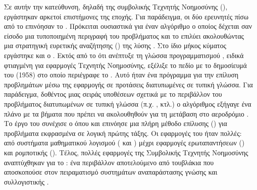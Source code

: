 Σε αυτήν την κατεύθυνση, δηλαδή της συμβολικής Τεχνητής Νοημοσύνης (), εργάστηκαν αρκετοί επιστήμονες της εποχής. Για παράδειγμα, οι δύο ερευνητές πίσω από το  επινόησαν το . Πρόκειται ουσιαστικά για έναν αλγόριθμο ο οποίος δέχεται σαν είσοδο μια τυποποιημένη περιγραφή του προβλήματος και το επιλύει ακολουθώντας μια στρατηγική ευρετικής αναζήτησης () της λύσης \cite{russell2020artificial}. Στο ίδιο μήκος κύματος εργάστηκε και ο . Εκτός από το ότι ανέπτυξε τη γλώσσα προγραμματισμού , ειδικά φτιαγμένη για εφαρμογές Τεχνητής Νοημοσύνης, εξέλιξε το πεδίο με το δημοσίευμά του  (1958) στο οποίο περιέγραφε το . Αυτό ήταν ένα πρόγραμμα για την επίλυση προβλημάτων μέσω της εφαρμογής  σε προτάσεις διατυπωμένες σε τυπική γλώσσα. Για παράδειγμα, δοθέντος μιας σειράς υποθέσεων σχετικά με το περιβάλλον του προβλήματος διατυπωμένων σε τυπική γλώσσα (π.χ. ,  κτλ.) ο αλγόριθμος εξήγαγε ένα πλάνο με τα βήματα που πρέπει να ακολουθηθούν για τη μετάβαση στο αεροδρόμιο \cite{McCarthy1960ProgramsWC}. Το έργο του συνέχισε ο  όπου και επινόησε μια πλήρη μέθοδο επίλυσης () για προβλήματα εκφρασμένα σε λογική πρώτης τάξης. Οι εφαρμογές του ήταν πολλές: από συστήματα μαθηματικού λογισμού ( \cite{Slagle/10.1145/321186.321193} και ) μέχρι εφαρμογές ερωταπαντήσεων () και ρομποτικής (). Τέλος, πολλές εφαρμογές της Συμβολικής Τεχνητής Νοημοσύνης αναπτύχθηκαν για το  : ένα περιβάλλον αποτελούμενο από τουβλάκια που αποσκοπούσε στον πειραματισμό συστημάτων αναπαράστασης γνώσης και συλλογιστικής \cite{slaney2001blocks}.
\par

